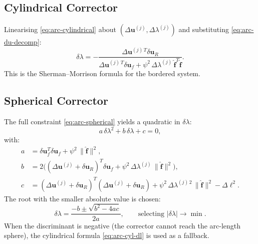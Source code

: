 \subsection{Cylindrical Corrector}

Linearising \eqref{eq:arc-cylindrical} about
$(\Delta\mathbf{u}^{(j)}, \Delta\lambda^{(j)})$ and substituting
\eqref{eq:arc-du-decomp}:
\begin{equation}
  \label{eq:arc-cyl-dl}
  \delta\lambda = -\frac{
    \Delta\mathbf{u}^{(j)\,T} \delta\mathbf{u}_R
  }{
    \Delta\mathbf{u}^{(j)\,T} \delta\mathbf{u}_f
    + \psi^2 \, \Delta\lambda^{(j)} \,
      \hat{\mathbf{f}}^T \hat{\mathbf{f}}
  }.
\end{equation}
This is the Sherman--Morrison formula for the bordered system.

\subsection{Spherical Corrector}

The full constraint \eqref{eq:arc-spherical} yields a quadratic in
$\delta\lambda$:
\begin{equation}
  \label{eq:arc-sph-quad}
  a\,\delta\lambda^2 + b\,\delta\lambda + c = 0,
\end{equation}
with:
\begin{align}
  a &= \delta\mathbf{u}_f^T \delta\mathbf{u}_f
       + \psi^2 \, \|\hat{\mathbf{f}}\|^2, \\
  b &= 2 \bigl(
         (\Delta\mathbf{u}^{(j)} + \delta\mathbf{u}_R)^T
         \delta\mathbf{u}_f
         + \psi^2 \, \Delta\lambda^{(j)} \,
           \|\hat{\mathbf{f}}\|^2
       \bigr), \\
  c &= (\Delta\mathbf{u}^{(j)} + \delta\mathbf{u}_R)^T
       (\Delta\mathbf{u}^{(j)} + \delta\mathbf{u}_R)
       + \psi^2 \, \Delta\lambda^{(j)\,2} \,
         \|\hat{\mathbf{f}}\|^2
       - \Delta\ell^2.
\end{align}
The root with the smaller absolute value is chosen:
\begin{equation}
  \delta\lambda = \frac{-b \pm \sqrt{b^2 - 4ac}}{2a},
  \qquad \text{selecting } |\delta\lambda| \to \min.
\end{equation}
When the discriminant is negative (the corrector cannot reach the
arc-length sphere), the cylindrical formula
\eqref{eq:arc-cyl-dl} is used as a fallback.


